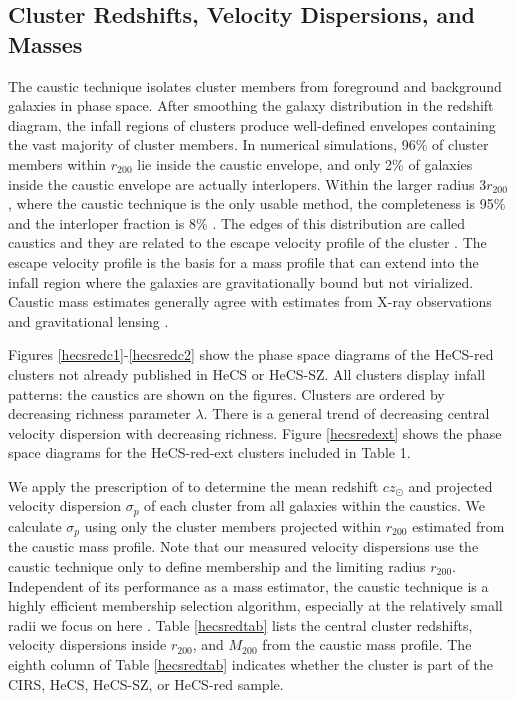 \subsection{Cluster Redshifts, Velocity Dispersions, and Masses}

The caustic technique \citep{dg97,diaferio1999,serra11} isolates cluster members from foreground and background galaxies 
in phase space.  After smoothing the galaxy distribution in the redshift diagram, the infall regions of 
clusters produce well-defined envelopes containing the vast majority of cluster 
members.  In numerical simulations, 96\% of cluster members within $r_{200}$ lie 
inside the caustic envelope, and 
only 2\% of galaxies inside the caustic envelope are actually interlopers. Within the larger
radius $3r_{200}$ , where the caustic technique is the only usable method, the completeness is 95\% and the interloper fraction is 8\% \citep{serra12}.
The edges of this distribution are called caustics and they are related 
to the escape velocity profile of the cluster \citep[see][for reviews]{diaferio09,serra11}.  
The escape velocity profile is the basis for a mass profile that can extend 
into the infall region where the galaxies are gravitationally bound but not virialized.
Caustic mass estimates generally agree with
estimates from X-ray observations and gravitational lensing
\citep[e.g.,][and references therein]{cairnsi,bg03,diaferio05,cirsi,cirsmf,hecslens}.


Figures \ref{hecsredc1}-\ref{hecsredc2} show 
the phase space 
diagrams of the HeCS-red clusters not already published in HeCS or 
HeCS-SZ.  All clusters display  infall 
patterns: the caustics are shown on the figures.
Clusters are ordered by decreasing richness parameter $\lambda$.
There is a general trend of decreasing central velocity dispersion 
with decreasing richness.  Figure \ref{hecsredext} shows the 
phase space diagrams for the HeCS-red-ext clusters included
in Table 1. 

We apply the prescription of \citet{danese} to determine the mean
redshift $cz_\odot$ and projected velocity dispersion $\sigma_p$ of
each cluster from all galaxies within the caustics.  We calculate
$\sigma_p$ using only the cluster members projected within $r_{200}$
estimated from the caustic mass profile.  
Note that our measured velocity dispersions use the caustic technique 
only to define membership and the limiting radius $r_{200}$.  Independent
of its performance as a mass estimator, the caustic technique is a highly 
efficient membership selection algorithm, especially at the relatively 
small radii we focus on here \citep{serra12}.  Table \ref{hecsredtab} 
lists the central cluster redshifts, velocity dispersions inside $r_{200}$,
and $M_{200}$ from the caustic mass profile. The eighth column of 
Table \ref{hecsredtab} indicates whether the cluster is part of the CIRS, 
HeCS, HeCS-SZ, or HeCS-red sample.

